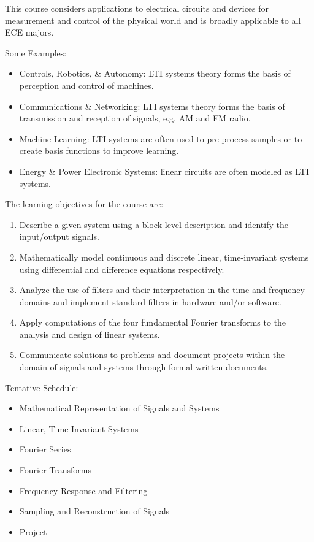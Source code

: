   This course considers applications to electrical circuits and devices for measurement and control of the physical world and is broadly applicable to all ECE majors.

  Some Examples:
  
  \begin{itemize}
  \item Controls, Robotics, \& Autonomy: LTI systems theory forms the basis of perception and control of machines.
  \item Communications \& Networking: LTI systems theory forms the basis of transmission and reception of signals, e.g. AM and FM radio.
  \item Machine Learning: LTI systems are often used to pre-process samples or to create basis functions to improve learning.
  \item Energy \& Power Electronic Systems: linear circuits are often modeled as LTI systems.
  \end{itemize}

The learning objectives for the course are:

\begin{enumerate}
\item Describe a given system using a block-level description and identify the input/output signals.
\item Mathematically model continuous and discrete linear, time-invariant systems using differential and difference equations
  respectively.
\item Analyze the use of filters and their interpretation in the time and frequency domains and implement standard filters in
  hardware and/or software.
\item Apply computations of the four fundamental Fourier transforms to the analysis and design of linear systems.
\item Communicate solutions to problems and document projects within the domain of signals and systems through formal written documents.
\end{enumerate}

Tentative Schedule:\\

\begin{itemize}
\item Mathematical Representation of Signals and Systems
\item Linear, Time-Invariant Systems
\item Fourier Series
\item Fourier Transforms
\item Frequency Response and Filtering
\item Sampling and Reconstruction of Signals
\item Project
\end{itemize}

